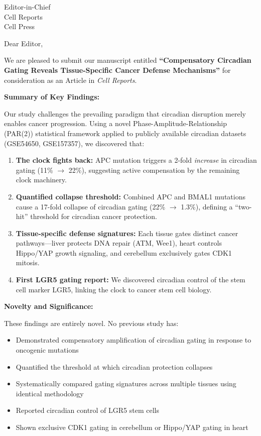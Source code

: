 \documentclass[11pt,letterpaper]{letter}
\begin{document}
\begin{letter}{Editor-in-Chief\\Cell Reports\\Cell Press}

\opening{Dear Editor,}

We are pleased to submit our manuscript entitled \textbf{``Compensatory Circadian Gating Reveals Tissue-Specific Cancer Defense Mechanisms''} for consideration as an Article in \textit{Cell Reports}.

\textbf{Summary of Key Findings:}

Our study challenges the prevailing paradigm that circadian disruption merely enables cancer progression. Using a novel Phase-Amplitude-Relationship (PAR(2)) statistical framework applied to publicly available circadian datasets (GSE54650, GSE157357), we discovered that:

\begin{enumerate}
\item \textbf{The clock fights back:} APC mutation triggers a 2-fold \textit{increase} in circadian gating (11\% $\rightarrow$ 22\%), suggesting active compensation by the remaining clock machinery.

\item \textbf{Quantified collapse threshold:} Combined APC and BMAL1 mutations cause a 17-fold collapse of circadian gating (22\% $\rightarrow$ 1.3\%), defining a ``two-hit'' threshold for circadian cancer protection.

\item \textbf{Tissue-specific defense signatures:} Each tissue gates distinct cancer pathways---liver protects DNA repair (ATM, Wee1), heart controls Hippo/YAP growth signaling, and cerebellum exclusively gates CDK1 mitosis.

\item \textbf{First LGR5 gating report:} We discovered circadian control of the stem cell marker LGR5, linking the clock to cancer stem cell biology.
\end{enumerate}

\textbf{Novelty and Significance:}

These findings are entirely novel. No previous study has:
\begin{itemize}
\item Demonstrated compensatory amplification of circadian gating in response to oncogenic mutations
\item Quantified the threshold at which circadian protection collapses
\item Systematically compared gating signatures across multiple tissues using identical methodology
\item Reported circadian control of LGR5 stem cells
\item Shown exclusive CDK1 gating in cerebellum or Hippo/YAP gating in heart
\end{itemize}


\end{letter}
\end{document}
